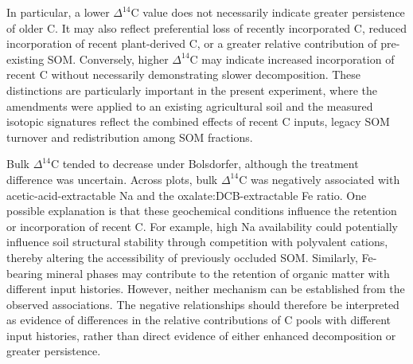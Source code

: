 \documentclass[preprint,12pt]{elsarticle}
\begin{document}
In particular, a lower $\Delta^{14}$C value does not necessarily indicate greater persistence of older C. It may also reflect preferential loss of recently incorporated C, reduced incorporation of recent plant-derived C, or a greater relative contribution of pre-existing SOM. Conversely, higher $\Delta^{14}$C may indicate increased incorporation of recent C without necessarily demonstrating slower decomposition. These distinctions are particularly important in the present experiment, where the amendments were applied to an existing agricultural soil and the measured isotopic signatures reflect the combined effects of recent C inputs, legacy SOM turnover and redistribution among SOM fractions.

Bulk $\Delta^{14}$C tended to decrease under Bolsdorfer, although the treatment difference was uncertain. Across plots, bulk $\Delta^{14}$C was negatively associated with acetic-acid-extractable Na and the oxalate:DCB-extractable Fe ratio. One possible explanation is that these geochemical conditions influence the retention or incorporation of recent C. For example, high Na availability could potentially influence soil structural stability through competition with polyvalent cations, thereby altering the accessibility of previously occluded SOM. Similarly, Fe-bearing mineral phases may contribute to the retention of organic matter with different input histories. However, neither mechanism can be established from the observed associations. The negative relationships should therefore be interpreted as evidence of differences in the relative contributions of C pools with different input histories, rather than direct evidence of either enhanced decomposition or greater persistence.
\end{document}
